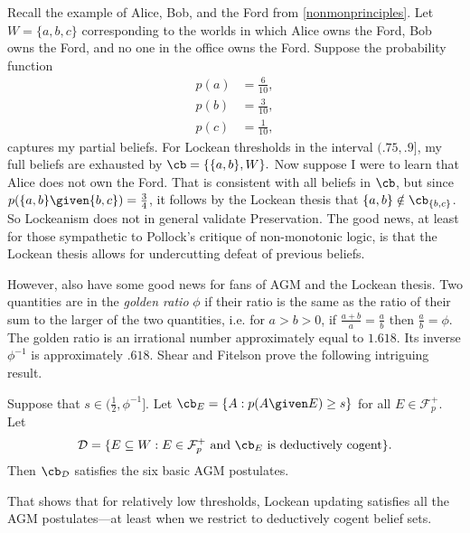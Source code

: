 Recall the example of Alice, Bob, and the Ford from \autoref{nonmonprinciples}.
Let $W=\{a, b, c\}$ corresponding to the worlds in which Alice owns the Ford,
Bob owns the Ford, and no one in the office owns the Ford.  Suppose the
probability function
$$
\begin{aligned}
  p(a) &= \frac{6}{10},\\
  p(b) &= \frac{3}{10},\\
  p(c) &= \frac{1}{10},
\end{aligned}
$$
captures my partial beliefs. For Lockean thresholds in the interval $(.75,.9]$,
my full beliefs are exhausted by $\cb=\{ \{a,b\}, W\}.$ Now suppose I were to
learn  that Alice does not own the Ford. That is consistent with all beliefs in
$\cb$, but since $p(\{a,b\} \given \{b,c\}) = \frac{3}{4}$, it follows by the
Lockean thesis that $\{a,b\} \notin \cb_{\{b,c\}}$. So Lockeanism does not in
general validate Preservation. The good news, at least for those sympathetic to
Pollock's critique of non-monotonic logic, is that the Lockean thesis allows for
undercutting defeat of previous beliefs.

However, \citet{shear2018two} also have some good news for fans of AGM and the
Lockean thesis. Two quantities are in the {\em golden ratio} $\phi$ if their
ratio is the same as the ratio of their sum to the larger of the two quantities,
i.e. for $a>b>0$, if $\frac{a+b}{a} = \frac{a}{b}$ then $\frac{a}{b} = \phi$.
The golden ratio is an irrational number approximately equal to $1.618.$ Its
inverse $\phi^{-1}$ is approximately $.618.$ Shear and Fitelson prove the
following intriguing result.
\begin{theorem}
Suppose that $s\in (\frac{1}{2}, \phi^{-1}]$. Let $\cb_E = \{ A : p(A \given E)
\geq s\}$ for all $E\in\mathcal{F}_p^+$. Let $$\mathcal{D}=\{E\subseteq W :
E\in\mathcal{F}_p^+ \text{ and } \cb_E \text{ is deductively cogent} \}.$$ Then
$\cb_{\mathcal{D}}$ satisfies the six basic AGM postulates.
\end{theorem}
That shows that for relatively low thresholds, Lockean updating satisfies all
the AGM postulates---at least when we restrict to deductively cogent belief
sets.

